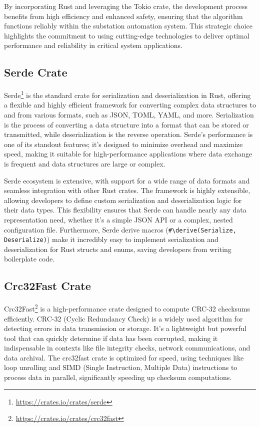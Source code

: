 By incorporating Rust and leveraging the Tokio crate, the development process benefits from high efficiency and enhanced safety, ensuring that the algorithm functions reliably within the substation automation system. This strategic choice highlights the commitment to using cutting-edge technologies to deliver optimal performance and reliability in critical system applications.

\subsection{Serde Crate}

Serde\footnote{\url{https://crates.io/crates/serde}} is the standard crate for serialization and deserialization in Rust, offering a flexible and highly efficient framework for converting complex data structures to and from various formats, such as JSON, TOML, YAML, and more. Serialization is the process of converting a data structure into a format that can be stored or transmitted, while deserialization is the reverse operation. Serde's performance is one of its standout features; it’s designed to minimize overhead and maximize speed, making it suitable for high-performance applications where data exchange is frequent and data structures are large or complex.

Serde ecosystem is extensive, with support for a wide range of data formats and seamless integration with other Rust crates. The framework is highly extensible, allowing developers to define custom serialization and deserialization logic for their data types. This flexibility ensures that Serde can handle nearly any data representation need, whether it's a simple JSON API or a complex, nested configuration file. Furthermore, Serde derive macros (\texttt{\#\textbackslash{}derive(Serialize, Deserialize)}) make it incredibly easy to implement serialization and deserialization for Rust structs and enums, saving developers from writing boilerplate code.

\subsection{Crc32Fast Crate}

Crc32Fast\footnote{\url{https://crates.io/crates/crc32fast}} is a high-performance crate designed to compute CRC-32 checksums efficiently. CRC-32 (Cyclic Redundancy Check) is a widely used algorithm for detecting errors in data transmission or storage. It’s a lightweight but powerful tool that can quickly determine if data has been corrupted, making it indispensable in contexts like file integrity checks, network communications, and data archival. The crc32fast crate is optimized for speed, using techniques like loop unrolling and SIMD (Single Instruction, Multiple Data) instructions to process data in parallel, significantly speeding up checksum computations.

